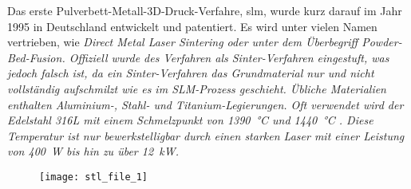 \documentclass[../main.tex]{subfiles}
\begin{document}
Das erste Pulverbett-Metall-3D-Druck-Verfahre, \acrfull{slm}, wurde kurz darauf im Jahr 1995 in Deutschland entwickelt und patentiert. Es wird unter vielen Namen vertrieben, wie \it{Direct Metal Laser Sintering} oder unter dem Überbegriff \it{Powder-Bed-Fusion}. Offiziell wurde des Verfahren als Sinter-Verfahren eingestuft, was jedoch falsch ist, da ein Sinter-Verfahren das Grundmaterial nur  und nicht vollständig aufschmilzt wie es im SLM-Prozess geschieht. Übliche Materialien enthalten Aluminium-, Stahl- und Titanium-Legierungen. Oft verwendet wird der Edelstahl 316L mit einem Schmelzpunkt von \qty{1390}{\celsius} und \qty{1440}{\degreeCelsius} \parencite{610LSTEEL}. Diese Temperatur ist nur bewerkstelligbar durch einen starken Laser mit einer Leistung von \qty{400}{\watt} bis hin zu über \qty{12}{\kilo\watt}.

\begin{figure}[h]
\begin{center}
	\texttt{[image: stl\_file\_1]}
	\label{img:stl_1}
\end{center}
\end{figure}	
\end{document}
